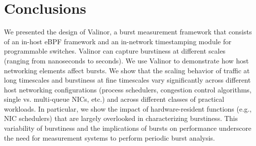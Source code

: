 \section{Conclusions}
\label{sec:valinor-conclusion}

We presented the design of Valinor, a burst measurement framework that consists of an in-host eBPF framework and an in-network timestamping module for programmable switches. Valinor can capture burstiness at different scales (ranging from nanoseconds to seconds).
We use Valinor to demonstrate how host networking elements affect bursts. 
We show that the scaling behavior of traffic at long timescales and burstiness at fine timescales vary significantly across different host networking configurations (process schedulers, congestion control algorithms, single vs. multi-queue NICs, etc.) and across different classes of practical workloads. In particular, we show the impact of hardware-resident functions (e.g., NIC schedulers) that are largely overlooked in characterizing burstiness. 
This variability of burstiness and the implications of bursts on performance underscore the need for  measurement systems to perform periodic burst analysis.
